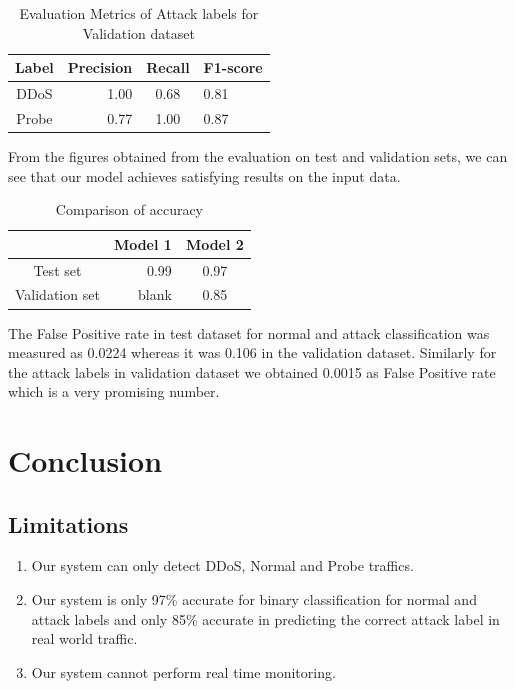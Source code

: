 \begin{table}[tbh]
	\centering
	\begin{tabular}{|c|r|c|l|} %
		\hline %
		Label  &Precision &Recall &F1-score\\
		\hline %
		DDoS &1.00 &0.68 &0.81\\
		\hline %
		Probe &0.77 &1.00 &0.87\\
		\hline
	\end{tabular}
	\caption{Evaluation Metrics of Attack labels for Validation dataset}
	\label{Evaluation Metrics of Attack labels for validation dataset}
\end{table}
From the figures obtained from the evaluation on test and validation sets, we can see that our model achieves satisfying results on the input data. \par
\begin{table}[tbh]
	\centering
	\begin{tabular}{|c|r|c|} %
		\hline %
		  &Model 1 &Model 2 \\
		\hline %
		Test set &0.99 &0.97 \\
		\hline %
		Validation set &blank &0.85 \\
		\hline
	\end{tabular}
	\caption{Comparison of accuracy}
	\label{Accuracy comparison}
\end{table}
The False Positive rate in test dataset for normal and attack classification was measured as 0.0224 whereas it was 0.106 in the validation dataset. Similarly for the attack labels in validation dataset we obtained 0.0015 as False Positive rate which is a very promising number.
\chapter{Conclusion}
\vspace{-18pt}
\section{Limitations}
\vspace{-18pt}
\begin{enumerate}[label=\roman*.]
	\item Our system can only detect DDoS, Normal and Probe traffics.
	\item Our system is only 97\% accurate for binary classification for normal and attack labels and only 85\% accurate in predicting the correct attack label in real world traffic.
	\item Our system cannot perform real time monitoring.
\end{enumerate}
